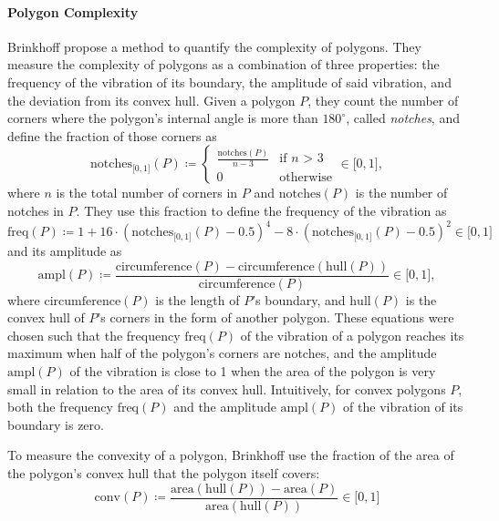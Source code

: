 \paragraph{Polygon Complexity}

Brinkhoff \etal{} \cite{brinkhoff1995measuring} propose a method to quantify the complexity of polygons.
They measure the complexity of polygons as a combination of three properties: the frequency of the vibration of its boundary, the amplitude of said vibration, and the deviation from its convex hull.
Given a polygon $P$, they count the number of corners where the polygon's internal angle is more than $180^\circ$, called \emph{notches}, and define the fraction of those corners as
%
\begin{equation*}
\text{notches}_{\lbrack0,1\rbrack}(P) \coloneqq
\begin{cases}
\frac{\text{notches}(P)}{n - 3} & \text{if $n$ > 3}\\
0 & \text{otherwise}
\end{cases}
\in \lbrack0,1\rbrack
,
\end{equation*}
%
where $n$ is the total number of corners in $P$ and $\text{notches}(P)$ is the number of notches in $P$.
They use this fraction to define the frequency of the vibration as
%
\begin{equation*}
\text{freq}(P) \coloneqq 1
+ 16 \cdot (\text{notches}_{\lbrack0,1\rbrack}(P) - 0.5)^4
- 8 \cdot (\text{notches}_{\lbrack0,1\rbrack}(P) - 0.5)^2
\in \lbrack0,1\rbrack
\end{equation*}
%
and its amplitude as
\begin{equation*}
\text{ampl}(P) \coloneqq
\frac{\text{circumference}(P) - \text{circumference}(\text{hull}(P))}{\text{circumference}(P)}
\in \lbrack0,1\rbrack
,
\end{equation*}
%
where $\text{circumference}(P)$ is the length of $P$'s boundary, and $\text{hull}(P)$ is the convex hull of $P$'s corners in the form of another polygon.
These equations were chosen such that the frequency $\text{freq}(P)$ of the vibration of a polygon reaches its maximum when half of the polygon's corners are notches, and the amplitude $\text{ampl}(P)$ of the vibration is close to 1 when the area of the polygon is very small in relation to the area of its convex hull.
Intuitively, for convex polygons $P$, both the frequency $\text{freq}(P)$ and the amplitude $\text{ampl}(P)$ of the vibration of its boundary is zero.

To measure the convexity of a polygon, Brinkhoff \etal{} use the fraction of the area of the polygon's convex hull that the polygon itself covers:
%
\begin{equation*}
\text{conv}(P) \coloneqq
\frac{\text{area}(\text{hull}(P)) - \text{area}(P)}{\text{area}(\text{hull}(P))}
\in \lbrack0,1\rbrack
\end{equation*}

